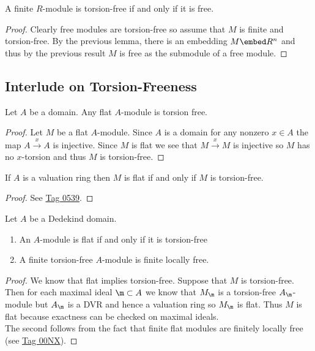 \documentclass[12pt]{article}
\begin{document}
\begin{prop}
A finite $R$-module is torsion-free if and only if it is free.
\end{prop}

\begin{proof}
Clearly free modules are torsion-free so assume that $M$ is finite and torsion-free. By the previous lemma, there is an embedding $M \embed R^n$ and thus by the previous result $M$ is free as the submodule of a free module.
\end{proof}

\subsection{Interlude on Torsion-Freeness}

\begin{lemma}
Let $A$ be a domain. Any flat $A$-module is torsion free.
\end{lemma}

\begin{proof}
Let $M$ be a flat $A$-module. Since $A$ is a domain for any nonzero $x \in A$ the map $A \xrightarrow{x} A$ is injective. Since $M$ is flat we see that $M \xrightarrow{x} M$ is injective so $M$ has no $x$-torsion and thus $M$ is torsion-free.
\end{proof}

\begin{lemma}
If $A$ is a valuation ring then $M$ is flat if and only if $M$ is torsion-free.
\end{lemma}

\begin{proof}
See \href{https://stacks.math.columbia.edu/tag/0539}{Tag 0539}.
\end{proof}

\begin{prop}
Let $A$ be a Dedekind domain. 
\begin{enumerate}
\item An $A$-module is flat if and only if it is torsion-free
\item A finite torsion-free $A$-module is finite locally free.
\end{enumerate}
\end{prop}

\begin{proof}
We know that flat implies torsion-free. Suppose that $M$ is torsion-free. Then for each maximal ideal $\m \subset A$ we know that $M_\m$ is a torsion-free $A_\m$-module but $A_\m$ is a DVR and hence a valuation ring so $M_\m$ is flat. Thus $M$ is flat because exactness can be checked on maximal ideals.
\bigskip\\
The second follows from the fact that finite flat modules are finitely locally free (see \href{https://stacks.math.columbia.edu/tag/00NX}{Tag 00NX}).
\end{proof}
\end{document}
